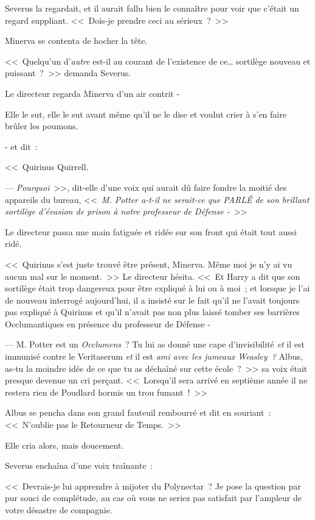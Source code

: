 Severus la regardait, et il aurait fallu bien le connaître pour voir que c'était un regard suppliant. <<~Dois-je prendre ceci au sérieux~?~>>

Minerva se contenta de hocher la tête.

<<~Quelqu'un d'\emph{autre} est-il au courant de l'existence de ce… sortilège nouveau et puissant~?~>> demanda Severus.

Le directeur regarda Minerva d'un air contrit -

Elle le sut, elle le sut avant même qu'il ne le dise et voulut crier à s'en faire brûler les poumons.

- et dit~:

<<~Quirinus Quirrell.

--- \emph{Pourquoi}~>>, dit-elle d'une voix qui aurait dû faire fondre la moitié des appareils du bureau, <<~\emph{M. Potter a-t-il ne serait-ce que PARLÉ de son brillant sortilège d'évasion de prison à notre professeur de Défense -}~>>

Le directeur passa une main fatiguée et ridée sur son front qui était tout aussi ridé.

<<~Quirinus s'est juste trouvé être présent, Minerva. Même moi je n'y ai vu aucun mal sur le moment.~>> Le directeur hésita. <<~Et Harry a dit que son sortilège était trop dangereux pour être expliqué à lui ou à moi~; et lorsque je l'ai de nouveau interrogé aujourd'hui, il a insisté sur le fait qu'il ne l'avait toujours pas expliqué à Quirinus et qu'il n'avait pas non plus laissé tomber ses barrières Occlumantiques en présence du professeur de Défense -

--- M. Potter est un \emph{Occlumens}~? Tu lui as donné une cape d'invisibilité \emph{et} il est immunisé contre le Veritaserum \emph{et} il est \emph{ami avec les jumeaux Weasley~?} Albus, as-tu la moindre idée de ce que tu as déchaîné sur cette école~?~>> sa voix était presque devenue un cri perçant. <<~Lorsqu'il sera arrivé en septième année il ne restera rien de Poudlard hormis un trou fumant~!~>>

Albus se pencha dans son grand fauteuil rembourré et dit en souriant~: <<~N'oublie pas le Retourneur de Temps.~>>

Elle cria alors, mais doucement.

Severus enchaîna d'une voix traînante~:

<<~Devrais-je lui apprendre à mijoter du Polynectar~? Je pose la question par pur souci de complétude, au cas où vous ne seriez pas satisfait par l'ampleur de votre désastre de compagnie.

